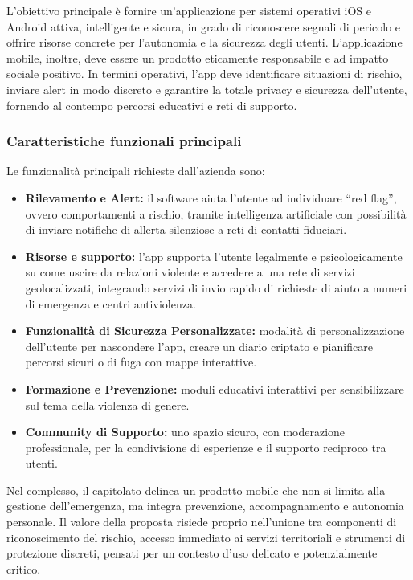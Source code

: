 \documentclass[a4paper,12pt]{article}
\begin{document}
L'obiettivo principale è fornire un'applicazione per sistemi operativi iOS e Android attiva, intelligente e sicura, in grado di riconoscere segnali di pericolo e offrire risorse concrete per l'autonomia e la sicurezza degli utenti. L’applicazione mobile, inoltre, deve essere un prodotto eticamente responsabile e ad impatto sociale positivo. In termini operativi, l’app deve identificare situazioni di rischio, inviare alert in modo discreto e garantire la totale privacy e sicurezza dell'utente, fornendo al contempo percorsi educativi e reti di supporto.

\subsubsection{Caratteristiche funzionali principali}

Le funzionalità principali richieste dall’azienda sono:
\begin{itemize}
    \item \textbf{Rilevamento e Alert:} il software aiuta l’utente ad individuare ``red flag'', ovvero comportamenti a rischio, tramite intelligenza artificiale con possibilità di inviare notifiche di allerta silenziose a reti di contatti fiduciari.
    \item \textbf{Risorse e supporto:} l’app supporta l’utente legalmente e psicologicamente su come uscire da relazioni violente e accedere a una rete di servizi geolocalizzati, integrando servizi di invio rapido di richieste di aiuto a numeri di emergenza e centri antiviolenza.
    \item \textbf{Funzionalità di Sicurezza Personalizzate:} modalità di personalizzazione dell’utente per nascondere l’app, creare un diario criptato e pianificare percorsi sicuri o di fuga con mappe interattive.
    \item \textbf{Formazione e Prevenzione:} moduli educativi interattivi per sensibilizzare sul tema della violenza di genere.
    \item \textbf{Community di Supporto:} uno spazio sicuro, con moderazione professionale, per la condivisione di esperienze e il supporto reciproco tra utenti.
\end{itemize}

Nel complesso, il capitolato delinea un prodotto mobile che non si limita alla gestione dell'emergenza, ma integra prevenzione, accompagnamento e autonomia personale. Il valore della proposta risiede proprio nell'unione tra componenti di riconoscimento del rischio, accesso immediato ai servizi territoriali e strumenti di protezione discreti, pensati per un contesto d'uso delicato e potenzialmente critico.
\end{document}
